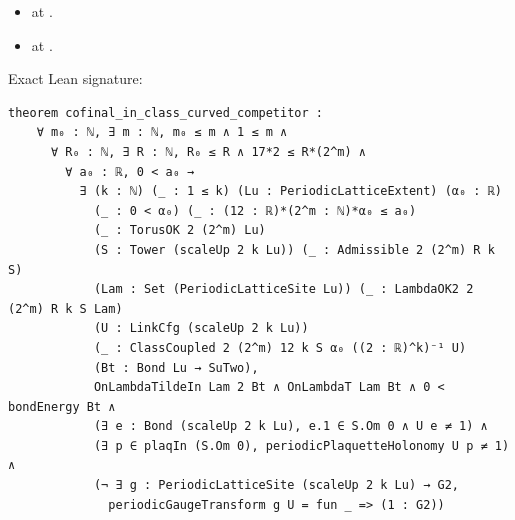\begin{theorem}[bp-034]
\begin{itemize}
\item \texttt{} at \texttt{}.
\item \texttt{} at \texttt{}.
\end{itemize}
\par Exact Lean signature:
\begin{verbatim}
theorem cofinal_in_class_curved_competitor :
    ∀ m₀ : ℕ, ∃ m : ℕ, m₀ ≤ m ∧ 1 ≤ m ∧
      ∀ R₀ : ℕ, ∃ R : ℕ, R₀ ≤ R ∧ 17*2 ≤ R*(2^m) ∧
        ∀ a₀ : ℝ, 0 < a₀ →
          ∃ (k : ℕ) (_ : 1 ≤ k) (Lu : PeriodicLatticeExtent) (α₀ : ℝ)
            (_ : 0 < α₀) (_ : (12 : ℝ)*(2^m : ℕ)*α₀ ≤ a₀)
            (_ : TorusOK 2 (2^m) Lu)
            (S : Tower (scaleUp 2 k Lu)) (_ : Admissible 2 (2^m) R k S)
            (Lam : Set (PeriodicLatticeSite Lu)) (_ : LambdaOK2 2 (2^m) R k S Lam)
            (U : LinkCfg (scaleUp 2 k Lu))
            (_ : ClassCoupled 2 (2^m) 12 k S α₀ ((2 : ℝ)^k)⁻¹ U)
            (Bt : Bond Lu → SuTwo),
            OnLambdaTildeIn Lam 2 Bt ∧ OnLambdaT Lam Bt ∧ 0 < bondEnergy Bt ∧
            (∃ e : Bond (scaleUp 2 k Lu), e.1 ∈ S.Om 0 ∧ U e ≠ 1) ∧
            (∃ p ∈ plaqIn (S.Om 0), periodicPlaquetteHolonomy U p ≠ 1) ∧
            (¬ ∃ g : PeriodicLatticeSite (scaleUp 2 k Lu) → G2,
              periodicGaugeTransform g U = fun _ => (1 : G2))
\end{verbatim}
\end{theorem}

